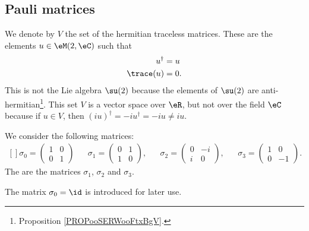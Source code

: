 \subsection{Pauli matrices}

We denote by \( V\) the set of the hermitian traceless matrices. These are the elements \( u\in \eM(2,\eC)\) such that
\begin{subequations}
	\begin{align}
		u^{\dag}  & =u  \\
		\trace(u) & =0.
	\end{align}
\end{subequations}
This is not the Lie algebra \( \su(2)\) because the elements of \( \su(2)\) are anti-hermitian\footnote{Proposition \ref{PROPooSERWooFtxBgV}.}. This set \( V\) is a vector space over \( \eR\), but not over the field \( \eC\) because if \( u\in V\), then \( (iu)^{\dag}=-iu^{\dag}=-iu\neq iu\).

\begin{definition}      \label{DEFooRNTDooTVkPtB}
	We consider the following matrices:
	\begin{equation}
		\begin{aligned}[]
			\sigma_0=\begin{pmatrix}
				         1 & 0 \\
				         0 & 1
			         \end{pmatrix} &  &
			\sigma_1=\begin{pmatrix}
				         0 & 1 \\
				         1 & 0
			         \end{pmatrix}, &  &
			\sigma_2=\begin{pmatrix}
				         0 & -i \\
				         i & 0
			         \end{pmatrix}, &  &
			\sigma_3=\begin{pmatrix}
				         1 & 0  \\
				         0 & -1
			         \end{pmatrix}.
		\end{aligned}
	\end{equation}
	The  are the matrices \( \sigma_1\), \( \sigma_2\) and \( \sigma_3\).
\end{definition}
The matrix \( \sigma_0=\id\) is introduced for later use.

